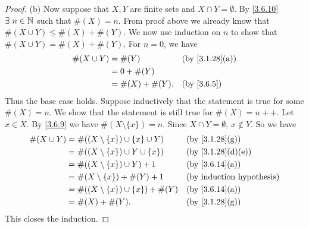 \begin{proof}{(b)}
  Now suppose that \(X, Y\) are finite sets and \(X \cap Y = \emptyset\).
  By \cref{3.6.10} \(\exists\ n \in \N\) such that \(\#(X) = n\).
  From proof above we already know that \(\#(X \cup Y) \leq \#(X) + \#(Y)\).
  We now use induction on \(n\) to show that \(\#(X \cup Y) = \#(X) + \#(Y)\).
  For \(n = 0\), we have
  \begin{align*}
    \#(X \cup Y) & = \#(Y)          &  & \text{(by \cref{3.1.28}(a))} \\
                 & = 0 + \#(Y)                                        \\
                 & = \#(X) + \#(Y). &  & \text{(by \cref{3.6.5})}
  \end{align*}
  Thus the base case holds.
  Suppose inductively that the statement is true for some \(\#(X) = n\).
  We show that the statement is still true for \(\#(X) = n++\).
  Let \(x \in X\).
  By \cref{3.6.9} we have \(\#(X \setminus \{x\}) = n\).
  Since \(X \cap Y = \emptyset\), \(x \notin Y\).
  So we have
  \begin{align*}
    \#(X \cup Y) & = \#((X \setminus \{x\}) \cup \{x\} \cup Y)  &  & \text{(by \cref{3.1.28}(g))}     \\
                 & = \#((X \setminus \{x\}) \cup Y \cup \{x\})  &  & \text{(by \cref{3.1.28}(d)(e))}  \\
                 & = \#((X \setminus \{x\}) \cup Y) + 1         &  & \text{(by \cref{3.6.14}(a))}     \\
                 & = \#(X \setminus \{x\}) + \#(Y) + 1          &  & \text{(by induction hypothesis)} \\
                 & = \#((X \setminus \{x\}) \cup \{x\}) + \#(Y) &  & \text{(by \cref{3.6.14}(a))}     \\
                 & = \#(X) + \#(Y).                             &  & \text{(by \cref{3.1.28}(g))}
  \end{align*}
  This closes the induction.
\end{proof}

